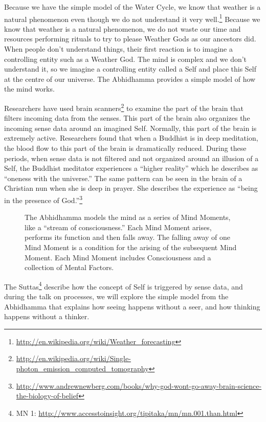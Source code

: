\pagebreak

Because we have the simple model of the Water Cycle, we know that weather is a natural phenomenon even though we do not understand it very well.\footnote{\url{http://en.wikipedia.org/wiki/Weather_forecasting}} Because we know that weather is a natural phenomenon, we do not waste our time and resources performing rituals to try to please Weather Gods as our ancestors did. When people don’t understand things, their first reaction is to imagine a controlling entity such as a Weather God. The mind is complex and we don’t understand it, so we imagine a controlling entity called a Self and place this Self at the centre of our universe. The Abhidhamma provides a simple model of how the mind works.

Researchers have used brain scanners\footnote{\url{http://en.wikipedia.org/wiki/Single-photon_emission_computed_tomography}} to examine the part of the brain that filters incoming data from the senses. This part of the brain also organizes the incoming sense data around an imagined Self. Normally, this part of the brain is extremely active. Researchers found that when a Buddhist is in deep meditation, the blood flow to this part of the brain is dramatically reduced. During these periods, when sense data is not filtered and not organized around an illusion of a Self, the Buddhist meditator experiences a “higher reality” which he describes as “oneness with the universe.” The same pattern can be seen in the brain of a Christian nun when she is deep in prayer. She describes the experience as “being in the presence of God.”\footnote{\url{http://www.andrewnewberg.com/books/why-god-wont-go-away-brain-science-the-biology-of-belief}}

\begin{figure}[H]
\centering

\caption{The Abhidhamma models the mind as a series of Mind Moments, like a “stream of consciousness.” Each Mind Moment arises, performs its function and then falls away. The falling away of one Mind Moment is a condition for the arising of the subsequent Mind Moment. Each Mind Moment includes Consciousness and a collection of Mental Factors.}
\label{fig:Model}
\end{figure}

The Suttas\footnote{MN 1: \url{http://www.accesstoinsight.org/tipitaka/mn/mn.001.than.html}} describe how the concept of Self is triggered by sense data, and during the talk on processes, we will explore the simple model from the Abhidhamma that explains how seeing happens without a seer, and how thinking happens without a thinker.

